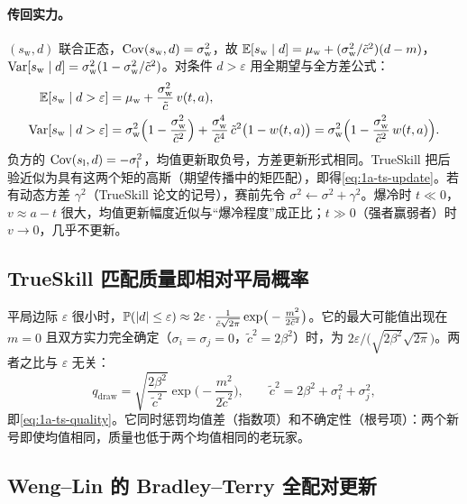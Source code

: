 \paragraph{传回实力。}$(s_{\mathrm w},d)$ 联合正态，$\operatorname{Cov}(s_{\mathrm w},d)=\sigma_{\mathrm w}^2$，故 $\mathbb{E}[s_{\mathrm w}\mid d]=\mu_{\mathrm w}+(\sigma_{\mathrm w}^2/\tilde c^2)(d-m)$，$\operatorname{Var}[s_{\mathrm w}\mid d]=\sigma_{\mathrm w}^2(1-\sigma_{\mathrm w}^2/\tilde c^2)$。对条件 $d>\varepsilon$ 用全期望与全方差公式：
\begin{align*}
  \mathbb{E}[s_{\mathrm w}\mid d>\varepsilon]&=\mu_{\mathrm w}+\frac{\sigma_{\mathrm w}^2}{\tilde c}\,v(t,a),\\
  \operatorname{Var}[s_{\mathrm w}\mid d>\varepsilon]&=\sigma_{\mathrm w}^2\Big(1-\frac{\sigma_{\mathrm w}^2}{\tilde c^2}\Big)+\frac{\sigma_{\mathrm w}^4}{\tilde c^4}\,\tilde c^2\big(1-w(t,a)\big)
  =\sigma_{\mathrm w}^2\Big(1-\frac{\sigma_{\mathrm w}^2}{\tilde c^2}\,w(t,a)\Big).
\end{align*}
负方的 $\operatorname{Cov}(s_{\mathrm l},d)=-\sigma_{\mathrm l}^2$，均值更新取负号，方差更新形式相同。TrueSkill 把后验近似为具有这两个矩的高斯（期望传播中的矩匹配），即得\cref{eq:1a-ts-update}。若有动态方差 $\gamma^2$（TrueSkill 论文的记号），赛前先令 $\sigma^2\leftarrow\sigma^2+\gamma^2$。爆冷时 $t\ll0$，$v\approx a-t$ 很大，均值更新幅度近似与“爆冷程度”成正比；$t\gg0$（强者赢弱者）时 $v\to0$，几乎不更新\tagOwn。

\subsection{TrueSkill 匹配质量即相对平局概率}\label{app:ch1a-quality}

平局边际 $\varepsilon$ 很小时，$\mathbb{P}(|d|\le\varepsilon)\approx 2\varepsilon\cdot\frac{1}{\tilde c\sqrt{2\pi}}\exp\!\big(-\frac{m^2}{2\tilde c^2}\big)$。它的最大可能值出现在 $m=0$ 且双方实力完全确定（$\sigma_i=\sigma_j=0$，$\tilde c^2=2\beta^2$）时，为 $2\varepsilon/\big(\sqrt{2\beta^2}\sqrt{2\pi}\big)$。两者之比与 $\varepsilon$ 无关：
\[
  q_{\text{draw}}=\sqrt{\frac{2\beta^2}{\tilde c^2}}\exp\!\Big(-\frac{m^2}{2\tilde c^2}\Big),\qquad \tilde c^2=2\beta^2+\sigma_i^2+\sigma_j^2 ,
\]
即\cref{eq:1a-ts-quality}。它同时惩罚均值差（指数项）和不确定性（根号项）：两个新号即使均值相同，质量也低于两个均值相同的老玩家\tagOwn。

\subsection{Weng–Lin 的 Bradley–Terry 全配对更新}\label{app:ch1a-wenglin}

